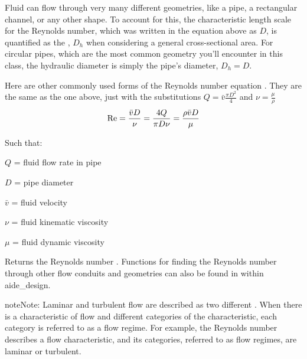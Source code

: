 \documentclass[letterpaper,10pt,english]{sphinxmanual}
\begin{document}
Fluid can flow through very many different geometries, like a pipe, a rectangular channel, or any other shape. To account for this, the characteristic length scale for the Reynolds number, which was written in the equation above as \(D\), is quantified as the , \(D_h\) when considering a general cross-sectional area. For circular pipes, which are the most common geometry you’ll encounter in this class, the hydraulic diameter is simply the pipe’s diameter, \(D_h = D\).

Here are other commonly used forms of the Reynolds number equation . They are the same as the one above, just with the substitutions \(Q = \bar v \frac{\pi D^2}{4}\) and \(\nu = \frac{\mu}{\rho}\)
\begin{equation}\label{equation:Fluids_Review/Fluids_Review_Design:Fluids_Review/Fluids_Review_Design:5}
\begin{split}{\rm Re} = \frac{\bar vD}{\nu} = \frac{4Q}{\pi D\nu} = \frac{\rho \bar vD}{\mu}\end{split}
\end{equation}
\begin{DUlineblock}{0em}
\item[] Such that:
\item[] \(Q\) = fluid flow rate in pipe
\item[] \(D\) = pipe diameter
\item[] \(\bar v\) = fluid velocity
\item[] \(\nu\) = fluid kinematic viscosity
\item[] \(\mu\) = fluid dynamic viscosity
\end{DUlineblock}




  Returns the Reynolds number . Functions for finding the Reynolds number through other flow conduits and geometries can also be found in  within aide\_design.



\begin{sphinxadmonition}{note}{Note:}
 Laminar and turbulent flow are described as two different . When there is a characteristic of flow and different categories of the characteristic, each category is referred to as a flow regime. For example, the Reynolds number describes a flow characteristic, and its categories, referred to as flow regimes, are laminar or turbulent.
\end{sphinxadmonition}
\end{document}
